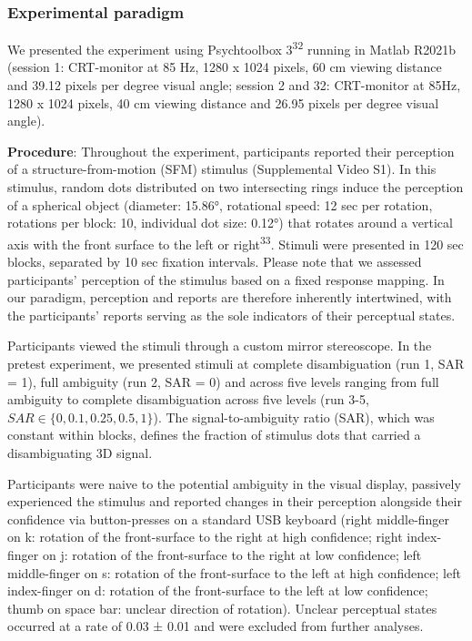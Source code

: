 \documentclass[
]{article}
\begin{document}
\subsubsection{Experimental paradigm}\label{experimental-paradigm}

We presented the experiment using Psychtoolbox 3\textsuperscript{32}
running in Matlab R2021b (session 1: CRT-monitor at 85 Hz, 1280 x 1024
pixels, 60 cm viewing distance and 39.12 pixels per degree visual angle;
session 2 and 32: CRT-monitor at 85Hz, 1280 x 1024 pixels, 40 cm viewing
distance and 26.95 pixels per degree visual angle).

\textbf{Procedure}: Throughout the experiment, participants reported
their perception of a structure-from-motion (SFM) stimulus (Supplemental
Video S1). In this stimulus, random dots distributed on two intersecting
rings induce the perception of a spherical object (diameter: 15.86°,
rotational speed: 12 sec per rotation, rotations per block: 10,
individual dot size: 0.12°) that rotates around a vertical axis with the
front surface to the left or right\textsuperscript{33}. Stimuli were
presented in 120 sec blocks, separated by 10 sec fixation intervals.
Please note that we assessed participants' perception of the stimulus
based on a fixed response mapping. In our paradigm, perception and
reports are therefore inherently intertwined, with the participants'
reports serving as the sole indicators of their perceptual states.

Participants viewed the stimuli through a custom mirror stereoscope. In
the pretest experiment, we presented stimuli at complete disambiguation
(run 1, SAR = 1), full ambiguity (run 2, SAR = 0) and across five levels
ranging from full ambiguity to complete disambiguation across five
levels (run 3-5, \(SAR \in \{0, 0.1, 0.25, 0.5, 1\}\)). The
signal-to-ambiguity ratio (SAR), which was constant within blocks,
defines the fraction of stimulus dots that carried a disambiguating 3D
signal.

Participants were naive to the potential ambiguity in the visual
display, passively experienced the stimulus and reported changes in
their perception alongside their confidence via button-presses on a
standard USB keyboard (right middle-finger on k: rotation of the
front-surface to the right at high confidence; right index-finger on j:
rotation of the front-surface to the right at low confidence; left
middle-finger on s: rotation of the front-surface to the left at high
confidence; left index-finger on d: rotation of the front-surface to the
left at low confidence; thumb on space bar: unclear direction of
rotation). Unclear perceptual states occurred at a rate of 0.03 ± 0.01
and were excluded from further analyses.
\end{document}

